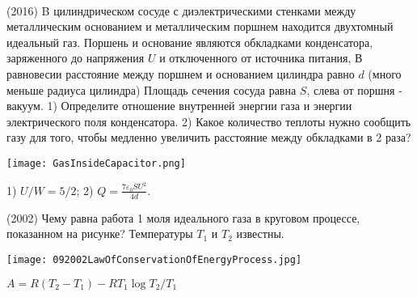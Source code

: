 \begin{ex}
\hspace{0pt} \\
\begin{minipage}{.65\textwidth}
(2016) B цилиндрическом сосуде с диэлектрическими стенками между металлическим основанием и металлическим поршнем находится двухтомный идеальный газ. Поршень и основание являются обкладками конденсатора, заряженного до напряжения $U$ и отключенного от источника питания, В равновесии расстояние между поршнем и основанием цилиндра равно $d$ (много меньше радиуса цилиндра) Площадь сечения сосуда равна $S$, слева от поршня - вакуум.
1) Определите отношение внутренней энергии газа и энергии электрического поля конденсатора. 2) Какое количество теплоты нужно сообщить газу для того, чтобы медленно увеличить расстояние между обкладками в 2 раза?
\end{minipage}
\begin{minipage}{.35\textwidth}
\centering
\texttt{[image: GasInsideCapacitor.png]}
\end{minipage}
\begin{ans}
1) $U/W=5/2$; 2) $Q=\frac{7\varepsilon_0 SU^2}{4d}$.
\end{ans}
\end{ex}

\begin{ex}
(2002) Чему равна работа 1 моля идеального газа в круговом процессе, показанном на рисунке? Температуры $T_1$ и $T_2$ известны.
\begin{center}
\end{center}
\texttt{[image: 092002LawOfConservationOfEnergyProcess.jpg]}
\begin{ans}
$A= R(T_2-T_1)-RT_1 \log T_2/T_1$
\end{ans}
\end{ex}


